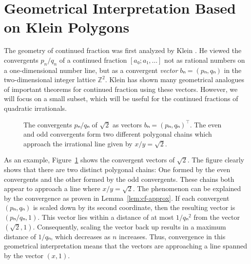 \section{Geometrical Interpretation Based on Klein Polygons}
\label{sec:cf-geometry}

The geometry of continued fraction was first analyzed by Klein \cite{Klein95}.
He viewed the convergents $p_n/q_n$ of a continued fraction $[a₀; a₁, …]$ not
as rational numbers on a one-dimensional number line,
but as a convergent \emph{vector} $bₙ = (pₙ, qₙ)$ in the two-dimensional integer lattice $ℤ^2$.
Klein has shown many geometrical analogues of important theorems for continued fraction
using these vectors.
However, we will focus on a small subset, which will be useful for the
continued fractions of quadratic irrationals.

\begin{figure}[tb]
  \centering
  
  \caption{
    The convergents $pₙ/qₙ$ of $\sqrt{2}$ as vectors $bₙ = (pₙ, qₙ)^⊤$.
    The even and odd convergents form two different polygonal chains which
    approach the irrational line given by $x/y = \sqrt{2}$.
  }
  \label{fig:klein-polygon}
\end{figure}

As an example, Figure~\ref{fig:klein-polygon} shows the convergent vectors of $\sqrt{2}$.
The figure clearly shows that there are two distinct polygonal chains:
One formed by the even convergents and the other formed by the odd convergents.
These chains both appear to approach a line where $x/y = \sqrt{2}$.
The phenomenon can be explained by the convergence as proven in Lemma~\ref{lem:cf-approx}.
If each convergent $(pₙ, qₙ)$ is scaled down by its second coordinate,
then the resulting vector is $(pₙ/qₙ, 1)$.
This vector lies within a distance of at most $1/qₙ^2$ from the vector $(\sqrt{2}, 1)$.
Consequently, scaling the vector back up results in a maximum distance of $1/qₙ$,
which decreases as $n$ increases.
Thus, convergence in this geometrical interpretation means that the vectors are
approaching a line spanned by the vector $(x, 1)$.

